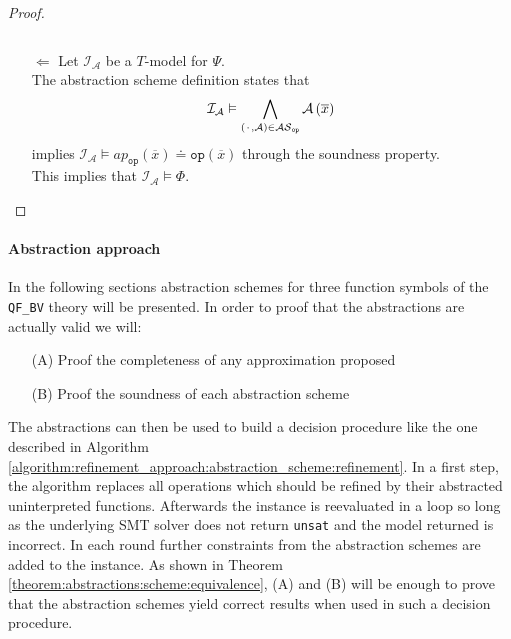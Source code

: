 \begin{theorem}
\begin{proof}
\begin{itemize}
\[        \]
    \item[$\Leftarrow$]  Let $\mathcal{I}_{\mathcal{A}}$ be a $T$-model for $\Psi$.\\
        The abstraction scheme definition states that
        \[
            \mathcal{I}_{\mathcal{A}} \vDash \bigwedge\limits_{\left({\mkern 2mu\cdot\mkern 2mu},\mathcal{A}\right)\in\mathcal{AS}_{\texttt{op}}} \mathcal{A}\left(\overline{x}\right)
        \] 
        implies $\mathcal{I}_{\mathcal{A}} \vDash ap_{\texttt{op}}\left(\overline{x}\right) \doteq \texttt{op}\left(\overline{x}\right)$ through the soundness property.\\
        This implies that $\mathcal{I}_{\mathcal{A}} \vDash \Phi$.
\end{itemize}
\end{proof}
\end{theorem}

\paragraph{Abstraction approach}
In the following sections abstraction schemes for three function symbols of the \texttt{QF\_BV} theory will be presented.
In order to proof that the abstractions are actually valid we will:
\begin{itemize}
    \item[(A)] Proof the completeness of any approximation proposed
    \item[(B)] Proof the soundness of each abstraction scheme
\end{itemize}
The abstractions can then be used to build a decision procedure like the one described in Algorithm \ref{algorithm:refinement_approach:abstraction_scheme:refinement}.
In a first step, the algorithm replaces all operations which should be refined by their abstracted uninterpreted functions. Afterwards the instance is reevaluated in a loop so long as the underlying SMT solver does not return \texttt{unsat} and the model returned is incorrect. In each round further constraints from the abstraction schemes are added to the instance.
As shown in Theorem \ref{theorem:abstractions:scheme:equivalence}, (A) and (B) will be enough to prove that the abstraction schemes yield correct results when used in such a decision procedure.\\


